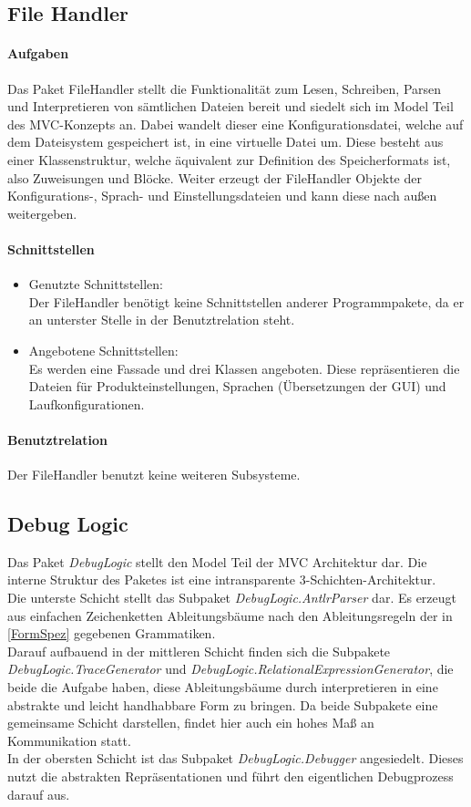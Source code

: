 \documentclass[parskip=full]{scrartcl}
\begin{document}
\subsection{File Handler}
\paragraph{Aufgaben}
Das Paket FileHandler stellt die Funktionalität zum Lesen, Schreiben, Parsen und Interpretieren von sämtlichen Dateien bereit und siedelt sich im Model Teil des MVC-Konzepts an.
Dabei wandelt dieser eine Konfigurationsdatei, welche auf dem Dateisystem gespeichert ist, in eine virtuelle Datei um.
Diese besteht aus einer Klassenstruktur, welche äquivalent zur Definition des Speicherformats ist, also Zuweisungen und Blöcke.
Weiter erzeugt der FileHandler Objekte der Konfigurations-, Sprach- und Einstellungsdateien und kann diese nach außen weitergeben.
\paragraph{Schnittstellen}
\begin{itemize}
\item Genutzte Schnittstellen: \\
Der FileHandler benötigt keine Schnittstellen anderer Programmpakete, da er an unterster Stelle in der Benutztrelation steht.
\item Angebotene Schnittstellen: \\
Es werden eine Fassade und drei Klassen angeboten.
Diese repräsentieren die Dateien für Produkteinstellungen, Sprachen (Übersetzungen der GUI) und Laufkonfigurationen.

\end{itemize}
\paragraph{Benutztrelation}
Der FileHandler benutzt keine weiteren Subsysteme.

\subsection{Debug Logic}
Das Paket \textit{DebugLogic} stellt den Model Teil der MVC Architektur dar. Die interne Struktur des Paketes ist eine intransparente 3-Schichten-Architektur.\\
Die unterste Schicht stellt das Subpaket \textit{DebugLogic.AntlrParser} dar. Es erzeugt aus einfachen Zeichenketten Ableitungsbäume nach den Ableitungsregeln der in \ref{FormSpez} gegebenen Grammatiken.\\ Darauf aufbauend in der mittleren Schicht finden sich die Subpakete \textit{DebugLogic.TraceGenerator} und \textit{DebugLogic.RelationalExpressionGenerator}, die beide die Aufgabe haben, diese Ableitungsbäume durch interpretieren in eine abstrakte und leicht handhabbare Form zu bringen. Da beide Subpakete eine gemeinsame Schicht darstellen, findet hier auch ein hohes Maß an Kommunikation statt. \\ In der obersten Schicht ist das Subpaket \textit{DebugLogic.Debugger} angesiedelt. Dieses nutzt die abstrakten Repräsentationen und führt den eigentlichen Debugprozess darauf aus.
\end{document}
